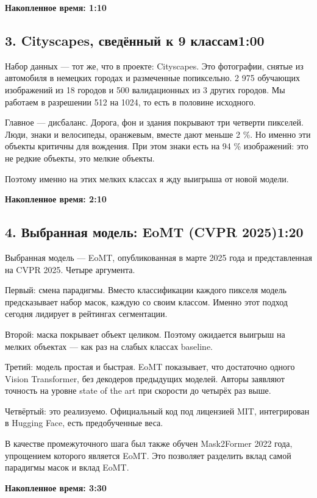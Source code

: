 \documentclass[11pt,a4paper]{article}
\newcommand{\cumul}[1]{\par{\hfill\small\color{accent}\bfseries #1}\par}
\newcommand{\tempo}[1]{\hfill{\normalsize\color{accent}#1}}
\begin{document}
\cumul{Накопленное время: 1:10}

\subsection*{3. Cityscapes, сведённый к 9 классам\tempo{1:00}}

Набор данных — тот же, что в проекте: Cityscapes. Это фотографии, снятые из автомобиля в немецких городах и размеченные попиксельно. 2 975 обучающих изображений из 18 городов и 500 валидационных из 3 других городов. Мы работаем в разрешении 512 на 1024, то есть в половине исходного.

Главное — дисбаланс. Дорога, фон и здания покрывают три четверти пикселей. Люди, знаки и велосипеды, оранжевым, вместе дают меньше 2 \%. Но именно эти объекты критичны для вождения. При этом знаки есть на 94 \% изображений: это не редкие объекты, это мелкие объекты.

Поэтому именно на этих мелких классах я жду выигрыша от новой модели.

\cumul{Накопленное время: 2:10}

\subsection*{4. Выбранная модель: EoMT (CVPR 2025)\tempo{1:20}}

Выбранная модель — EoMT, опубликованная в марте 2025 года и представленная на CVPR 2025. Четыре аргумента.

Первый: смена парадигмы. Вместо классификации каждого пикселя модель предсказывает набор масок, каждую со своим классом. Именно этот подход сегодня лидирует в рейтингах сегментации.

Второй: маска покрывает объект целиком. Поэтому ожидается выигрыш на мелких объектах — как раз на слабых классах baseline.

Третий: модель простая и быстрая. EoMT показывает, что достаточно одного Vision Transformer, без декодеров предыдущих моделей. Авторы заявляют точность на уровне state of the art при скорости до четырёх раз выше.

Четвёртый: это реализуемо. Официальный код под лицензией MIT, интегрирован в Hugging Face, есть предобученные веса.

В качестве промежуточного шага был также обучен Mask2Former 2022 года, упрощением которого является EoMT. Это позволяет разделить вклад самой парадигмы масок и вклад EoMT.

\cumul{Накопленное время: 3:30}
\end{document}
